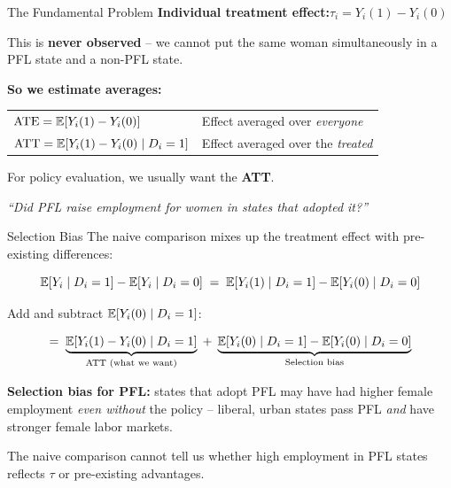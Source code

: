 \begin{frame}{The Fundamental Problem}
  \textbf{Individual treatment effect:}\quad $\tau_i = Y_i(1) - Y_i(0)$

  \vspace{6pt}

  This is \textbf{never observed} -- we cannot put the same woman simultaneously in a PFL state and a non-PFL state.

  \vspace{10pt}

  \textbf{So we estimate averages:}

  \vspace{6pt}

  \begin{tabular}{@{}ll@{}}
    $\text{ATE} = \mathbb{E}[Y_i(1) - Y_i(0)]$            & Effect averaged over \textit{everyone} \\[6pt]
    $\text{ATT} = \mathbb{E}[Y_i(1) - Y_i(0) \mid D_i=1]$ & Effect averaged over the \textit{treated} \\
  \end{tabular}

  \vspace{10pt}

  For policy evaluation, we usually want the \textbf{ATT}.

  \vspace{4pt}

  \textit{``Did PFL raise employment for women in states that adopted it?''}
\end{frame}

\begin{frame}{Selection Bias}
  \small
  The naive comparison mixes up the treatment effect with pre-existing differences:

  \vspace{4pt}

  \[
    \mathbb{E}[Y_i \mid D_i=1] - \mathbb{E}[Y_i \mid D_i=0]
    \;=\; \mathbb{E}[Y_i(1) \mid D_i=1] - \mathbb{E}[Y_i(0) \mid D_i=0]
  \]

  \vspace{2pt}

  Add and subtract $\mathbb{E}[Y_i(0) \mid D_i=1]$:

  \[
    =\;
    \underbrace{\mathbb{E}[Y_i(1) - Y_i(0) \mid D_i=1]}_{\text{ATT (what we want)}}
    \;+\;
    \underbrace{\mathbb{E}[Y_i(0) \mid D_i=1] - \mathbb{E}[Y_i(0) \mid D_i=0]}_{\text{Selection bias}}
  \]

  \vspace{6pt}

  \normalsize
  \textbf{Selection bias for PFL:} states that adopt PFL may have had higher female employment \textit{even without} the policy -- liberal, urban states pass PFL \textit{and} have stronger female labor markets.

  \vspace{4pt}

  The naive comparison cannot tell us whether high employment in PFL states reflects $\tau$ or pre-existing advantages.
\end{frame}

